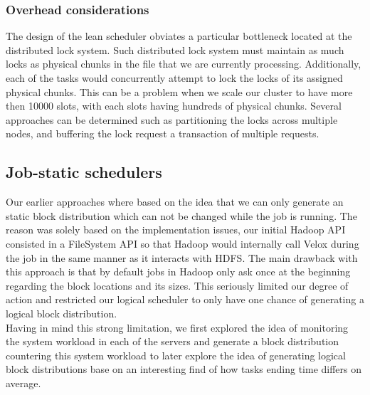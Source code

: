 \subsubsection{Overhead considerations}
The design of the lean scheduler obviates a particular bottleneck located at the distributed lock system. Such distributed lock system must maintain as much locks as physical chunks in the file that 
we are currently processing. Additionally, each of the tasks would concurrently attempt to lock the locks of its assigned physical chunks. This can be a problem when we scale our cluster to have more then 10000 slots, with each slots having hundreds of physical chunks. Several approaches can be determined such as partitioning the locks across multiple nodes, and buffering the lock request a transaction of multiple requests.  

\subsection{Job-static schedulers}
Our earlier approaches where based on the idea that we can only generate an static block distribution which can not be changed while the job is running.  The reason was solely based on the implementation issues, our initial Hadoop API consisted in a FileSystem API so that Hadoop would internally call Velox during the job in the same manner as it interacts with HDFS. The main drawback with this approach is that by default jobs in Hadoop only ask once at the beginning regarding the block locations and its sizes. This seriously limited our degree of action and restricted our logical scheduler to only have one chance of generating a logical block distribution. \\

Having in mind this strong limitation, we first explored the idea of monitoring the system workload in each of the servers and generate a block distribution countering this system workload to later explore the idea of generating logical block distributions base on an interesting find of how tasks ending time differs on average.

